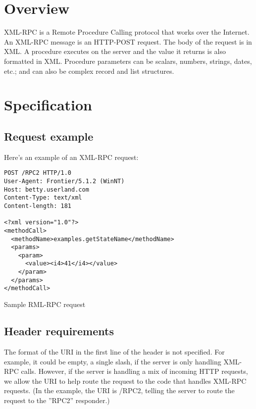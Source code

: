 %
%


\label{chap:xml-rpc}


%
%

\section{Overview}

XML-RPC is a Remote Procedure Calling protocol that works over the Internet.
An XML-RPC message is an HTTP-POST request. The body of the request is in XML. A procedure executes on the server and the value it returns is also formatted in XML.
Procedure parameters can be scalars, numbers, strings, dates, etc.; and can also be complex record and list structures.


%
%

\section{Specification}

\subsection{Request example}

Here's an example of an XML-RPC request:
\begin{code}
\begin{verbatim}
POST /RPC2 HTTP/1.0
User-Agent: Frontier/5.1.2 (WinNT)
Host: betty.userland.com
Content-Type: text/xml
Content-length: 181

<?xml version="1.0"?>
<methodCall>
  <methodName>examples.getStateName</methodName>
  <params>
    <param>
      <value><i4>41</i4></value>
    </param>
  </params>
</methodCall>
\end{verbatim}
\caption{Sample RML-RPC request}
\end{code}

\subsection{Header requirements}

The format of the URI in the first line of the header is not specified. For example, it could be empty, a single slash, if the server is only handling XML-RPC calls. However, if the server is handling a mix of incoming HTTP requests, we allow the URI to help route the request to the code that handles XML-RPC requests. (In the example, the URI is /RPC2, telling the server to route the request to the ''RPC2'' responder.)

